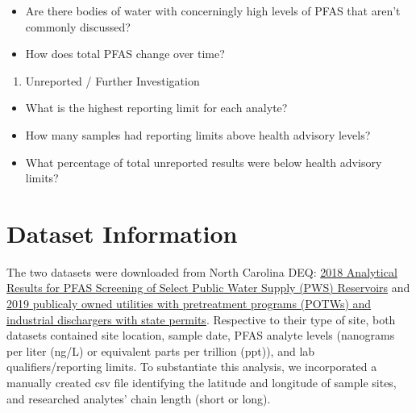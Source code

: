 \documentclass[
  12pt,
]{article}
\providecommand{\tightlist}{%
  \setlength{\itemsep}{0pt}\setlength{\parskip}{0pt}}
\begin{document}
\begin{itemize}
\tightlist
\item
  Are there bodies of water with concerningly high levels of PFAS that
  aren't commonly discussed?
\item
  How does total PFAS change over time?
\end{itemize}

\begin{enumerate}
\def\labelenumi{\arabic{enumi}.}
\setcounter{enumi}{2}
\tightlist
\item
  Unreported / Further Investigation
\end{enumerate}

\begin{itemize}
\tightlist
\item
  What is the highest reporting limit for each analyte?
\item
  How many samples had reporting limits above health advisory levels?
\item
  What percentage of total unreported results were below health advisory
  limits?
\end{itemize}

\newpage

\hypertarget{dataset-information}{%
\section{Dataset Information}\label{dataset-information}}

The two datasets were downloaded from North Carolina DEQ:
\href{https://deq.nc.gov/about/divisions/water-resources/water-resources-science-and-data/water-sciences-home-page/emerging}{2018
Analytical Results for PFAS Screening of Select Public Water Supply
(PWS) Reservoirs} and
\href{https://files.nc.gov/ncdeq/Water\%20Resources/GIS/Data/Emerging_Compounds_Mastersheet_12202019.pdf}{2019
publicaly owned utilities with pretreatment programs (POTWs) and
industrial dischargers with state permits}. Respective to their type of
site, both datasets contained site location, sample date, PFAS analyte
levels (nanograms per liter (ng/L) or equivalent parts per trillion
(ppt)), and lab qualifiers/reporting limits. To substantiate this
analysis, we incorporated a manually created csv file identifying the
latitude and longitude of sample sites, and researched analytes' chain
length (short or long).
\end{document}
